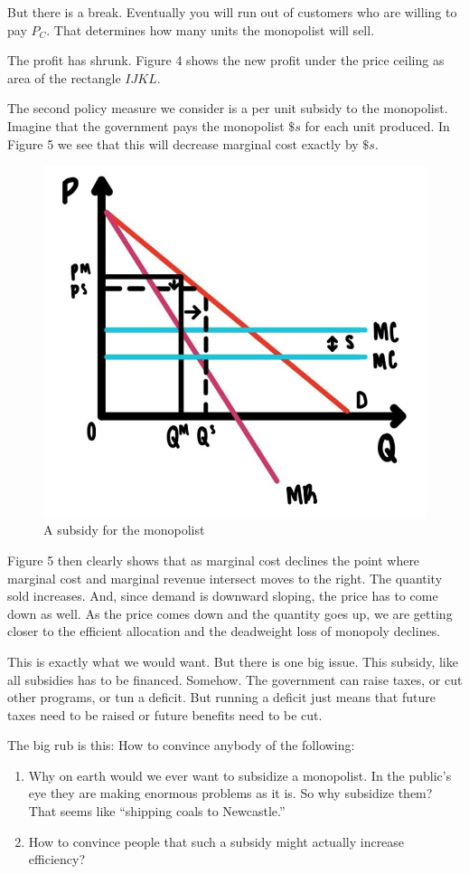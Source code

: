 \documentclass[
]{book}
\providecommand{\tightlist}{%
  \setlength{\itemsep}{0pt}\setlength{\parskip}{0pt}}
\begin{document}
But there is a break. Eventually you will run out of customers who are willing to pay \(P_C\). That determines how many units the monopolist will sell.

The profit has shrunk. Figure 4 shows the new profit under the price ceiling as area of the rectangle \(IJKL\).

The second policy measure we consider is a per unit subsidy to the monopolist. Imagine that the government pays the monopolist \(\$s\) for each unit produced. In Figure 5 we see that this will decrease marginal cost exactly by \(\$s\).

\begin{figure}

{\centering \includegraphics[width=0.5\linewidth]{img/monopoly/fig6} 

}

\caption{A subsidy for the monopolist}\label{fig:monopoly06}
\end{figure}

Figure 5 then clearly shows that as marginal cost declines the point where marginal cost and marginal revenue intersect moves to the right. The quantity sold increases. And, since demand is downward sloping, the price has to come down as well. As the price comes down and the quantity goes up, we are getting closer to the efficient allocation and the deadweight loss of monopoly declines.

This is exactly what we would want. But there is one big issue. This subsidy, like all subsidies has to be financed. Somehow. The government can raise taxes, or cut other programs, or tun a deficit. But running a deficit just means that future taxes need to be raised or future benefits need to be cut.

The big rub is this: How to convince anybody of the following:

\begin{enumerate}
\def\labelenumi{\arabic{enumi}.}
\tightlist
\item
  Why on earth would we ever want to subsidize a monopolist. In the public's eye they are making enormous problems as it is. So why subsidize them? That seems like ``shipping coals to Newcastle.''
\item
  How to convince people that such a subsidy might actually increase efficiency?
\end{enumerate}
\end{document}
